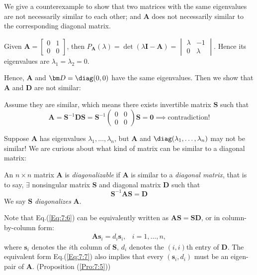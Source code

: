 \begin{example}
We give a counterexample to show that two matrices with the same eigenvalues are not necessarily similar to each other; and $\bm A$ does not necessarily similar to the corresponding diagonal matrix.

Given $\bm A=\begin{bmatrix}
0&1\\0&0
\end{bmatrix}$, then $P_{\bm A}(\lambda)=\det(\lambda\bm I-\bm A)=\begin{vmatrix}\lambda&-1\\0&\lambda\end{vmatrix}
$.  Hence its eigenvalues are $\lambda_1=\lambda_2=0$.

Hence, $\bm A$ and $\bm D=\diag(0,0)$ have the same eigenvalues. Then we show that $\bm A$ and $\bm D$ are not similar:

Assume they are similar, which means there exists invertible matrix $\bm S$ such that
\[
\bm A=\bm S^{-1}\bm D\bm S=\bm S^{-1}\begin{pmatrix}
0&0\\0&0
\end{pmatrix}\bm S=\bm 0\implies\mbox{contradiction!}
\]
\end{example}
Suppose $\bm A$ has eigenvalues $\lambda_1,\dots,\lambda_n$, but $\bm A$ and $\diag(\lambda_1,\dots,\lambda_n)$ may not be similar! We are curious about what kind of matrix can be similar to a diagonal matrix:
\begin{definition}[Diagonalizable]
An $n\times n$ matrix $\bm A$ is \emph{diagonalizable} if $\bm A$ is similar to a \textit{diagonal matrix}, that is to say,
$\exists$ nonsingular matrix $\bm S$ and diagonal matrix $\bm D$ such that
\begin{equation}\label{Eq:7:6}
\bm S^{-1}\bm A\bm S=\bm D
\end{equation}
We say $\bm S$ \textit{diagonalizes} $\bm A$.
\end{definition}
\begin{remark}
Note that Eq.(\ref{Eq:7:6}) can be equivalently written as $\bm{AS}=\bm{SD}$, or in column-by-column form:
\begin{equation}
\begin{array}{ll}
\bm{A}\bm s_i=d_i\bm s_i,
&
i=1,\dots,n,
\end{array}\label{Eq:7:7}
\end{equation}
where $\bm s_i$ denotes the $i$th column of $\bm S$, $d_i$ denotes the $(i,i)$th entry of $\bm D$. The equivalent form Eq.(\ref{Eq:7:7}) also implies that every $(\bm s_i,d_i)$ must be an eigen-pair of $\bm A$. (Proposition (\ref{Pro:7:5}))
\end{remark}
